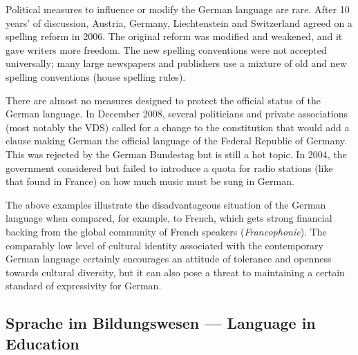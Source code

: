 \documentclass[]{../../metanetpaper}
\begin{document}
\begin{Parallel}[c]{80mm}{80mm}
{    Political measures to influence or modify the German language are rare. After 10 years’ of discussion, Austria, Germany, Liechtenstein and Switzerland agreed on a spelling reform in 2006. The original reform was modified and weakened, and it gave writers more freedom. The new spelling conventions were not accepted universally; many large newspapers and publishers use a mixture of old and new spelling conventions (house spelling rules).

    There are almost no measures designed to protect the official status of the German language. In December 2008, several politicians and private associations (most notably the VDS) called for a change to the constitution that would add a clause making German the official language of the Federal Republic of Germany. This was rejected by the German Bundestag but is still a hot topic. In 2004, the government considered but failed to introduce a quota for radio stations (like that found in France) on how much music must be sung in German. 

    The above examples illustrate the disadvantageous situation of the German language when compared, for example, to French, which gets strong financial backing from the global community of French speakers (\textit{Francophonie}). The comparably low level of cultural identity associated with the contemporary German language certainly encourages an attitude of tolerance and openness towards cultural diversity, but it can also pose a threat to maintaining a certain standard of expressivity for German.
  }

  \ParallelPar
  

  \subsection{Sprache im Bildungswesen --- Language in Education}

\end{Parallel}
\end{document}
